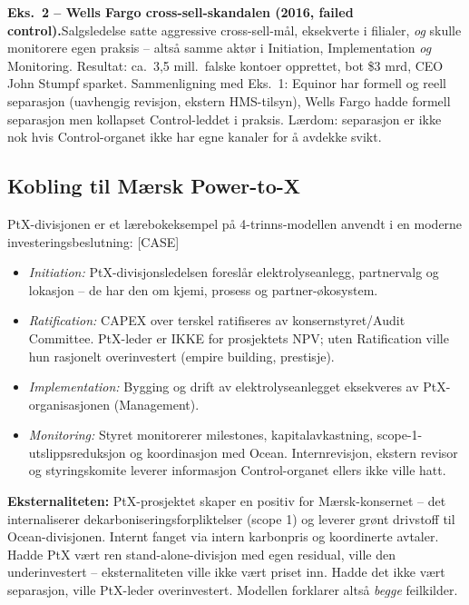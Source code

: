\textbf{Eks.~2 -- Wells Fargo cross-sell-skandalen (2016, failed control).}\quad [EKS]
Salgsledelse satte aggressive cross-sell-mål, eksekverte i filialer, \emph{og} skulle monitorere egen praksis -- altså samme aktør i Initiation, Implementation \emph{og} Monitoring. Resultat: ca.\ 3,5 mill.\ falske kontoer opprettet, bot \$3 mrd, CEO John Stumpf sparket. Sammenligning med Eks.~1: Equinor har formell og reell separasjon (uavhengig revisjon, ekstern HMS-tilsyn), Wells Fargo hadde formell separasjon men kollapset Control-leddet i praksis. Lærdom: separasjon er ikke nok hvis Control-organet ikke har egne kanaler for å avdekke svikt.

\subsection*{Kobling til Mærsk Power-to-X}
PtX-divisjonen er et lærebokeksempel på 4-trinns-modellen anvendt i en moderne investeringsbeslutning: [CASE]
\begin{itemize}\setlength{\itemsep}{2pt}
\item \emph{Initiation:} PtX-divisjonsledelsen foreslår elektrolyseanlegg, partnervalg og lokasjon -- de har den  om kjemi, prosess og partner-økosystem.
\item \emph{Ratification:} CAPEX over terskel ratifiseres av konsernstyret/Audit Committee. PtX-leder er IKKE  for prosjektets NPV; uten Ratification ville hun rasjonelt overinvestert (empire building, prestisje).
\item \emph{Implementation:} Bygging og drift av elektrolyseanlegget eksekveres av PtX-organisasjonen (Management).
\item \emph{Monitoring:} Styret monitorerer milestones, kapitalavkastning, scope-1-utslippsreduksjon og koordinasjon med Ocean. Internrevisjon, ekstern revisor og styringskomite leverer informasjon Control-organet ellers ikke ville hatt.
\end{itemize}
\textbf{Eksternaliteten:} PtX-prosjektet skaper en positiv  for Mærsk-konsernet -- det internaliserer dekarboniserings\-forpliktelser (scope 1) og leverer grønt drivstoff til Ocean-divisjonen. Internt fanget via intern karbonpris og koordinerte avtaler. Hadde PtX vært ren stand-alone-divisjon med egen residual, ville den underinvestert -- eksternaliteten ville ikke vært priset inn. Hadde det ikke vært separasjon, ville PtX-leder overinvestert. Modellen forklarer altså \emph{begge} feilkilder.

